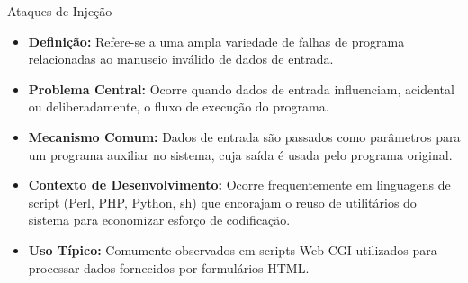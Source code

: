 \begin{frame}{Ataques de Injeção}
    \begin{itemize}
        \item \textbf{Definição:} Refere-se a uma ampla variedade de falhas de programa relacionadas ao manuseio inválido de dados de entrada.
        \item \textbf{Problema Central:} Ocorre quando dados de entrada influenciam, acidental ou deliberadamente, o fluxo de execução do programa.
        \item \textbf{Mecanismo Comum:} Dados de entrada são passados como parâmetros para um programa auxiliar no sistema, cuja saída é usada pelo programa original.
        \item \textbf{Contexto de Desenvolvimento:} Ocorre frequentemente em linguagens de script (Perl, PHP, Python, sh) que encorajam o reuso de utilitários do sistema para economizar esforço de codificação.
        \item \textbf{Uso Típico:} Comumente observados em scripts Web CGI utilizados para processar dados fornecidos por formulários HTML.
    \end{itemize}
\end{frame}

